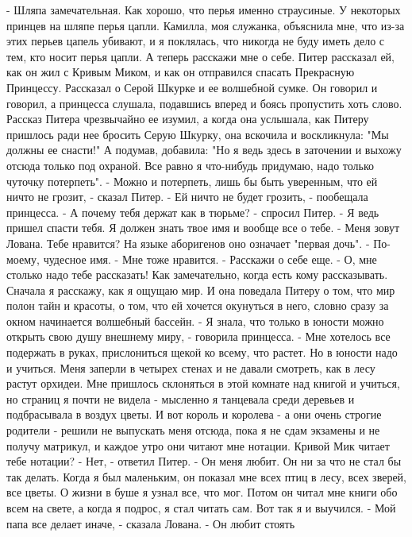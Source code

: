     - Шляпа замечательная. Как хорошо, что перья именно страусиные. У 
некоторых принцев на шляпе перья цапли. Камилла, моя служанка, 
объяснила мне, что из-за этих перьев цапель убивают, и я поклялась, 
что никогда не буду иметь дело с тем, кто носит перья цапли. А теперь 
расскажи мне о себе.
    Питер рассказал ей, как он жил с Кривым Миком, и как он отправился 
спасать Прекрасную Принцессу. Рассказал о Серой Шкурке и ее волшебной 
сумке. Он говорил и говорил, а принцесса слушала, подавшись вперед и 
боясь пропустить хоть слово. Рассказ Питера чрезвычайно ее изумил, а 
когда она услышала, как Питеру пришлось ради нее бросить Серую Шкурку, 
она вскочила и воскликнула: "Мы должны ее снасти!" А подумав, 
добавила: "Но я ведь здесь в заточении и выхожу отсюда только под 
охраной. Все равно я что-нибудь придумаю, надо только чуточку 
потерпеть".
    - Можно и потерпеть, лишь бы быть уверенным, что ей ничто не 
грозит, - сказал Питер.
    - Ей ничто не будет грозить, - пообещала принцесса.
    - А почему тебя держат как в тюрьме? - спросил Питер. - Я ведь 
пришел спасти тебя. Я должен знать твое имя и вообще все о тебе.
    - Меня зовут Лована. Тебе нравится? На языке аборигенов оно 
означает "первая дочь".
    - По-моему, чудесное имя.
    - Мне тоже нравится.
    - Расскажи о себе еще.
    - О, мне столько надо тебе рассказать! Как замечательно, когда 
есть кому рассказывать. Сначала я расскажу, как я ощущаю мир.
    И она поведала Питеру о том, что мир полон тайн и красоты, о том, 
что ей хочется окунуться в него, словно сразу за окном начинается 
волшебный бассейн.
    - Я знала, что только в юности можно открыть свою душу внешнему 
миру, - говорила принцесса. - Мне хотелось все подержать в руках, 
прислониться щекой ко всему, что растет. Но в юности надо и учиться. 
Меня заперли в четырех стенах и не давали смотреть, как в лесу растут 
орхидеи. Мне пришлось склоняться в этой комнате над книгой и учиться, 
но страниц я почти не видела - мысленно я танцевала среди деревьев и 
подбрасывала в воздух цветы. И вот король и королева - а они очень 
строгие родители - решили не выпускать меня отсюда, пока я не сдам 
экзамены и не получу матрикул, и каждое утро они читают мне нотации. 
Кривой Мик читает тебе нотации?
    - Нет, - ответил Питер. - Он меня любит. Он ни за что не стал бы 
так делать. Когда я был маленьким, он показал мне всех птиц в лесу, 
всех зверей, все цветы. О жизни в буше я узнал все, что мог. Потом он 
читал мне книги обо всем на свете, а когда я подрос, я стал читать 
сам. Вот так я и выучился.
    - Мой папа все делает иначе, - сказала Лована. - Он любит стоять 
